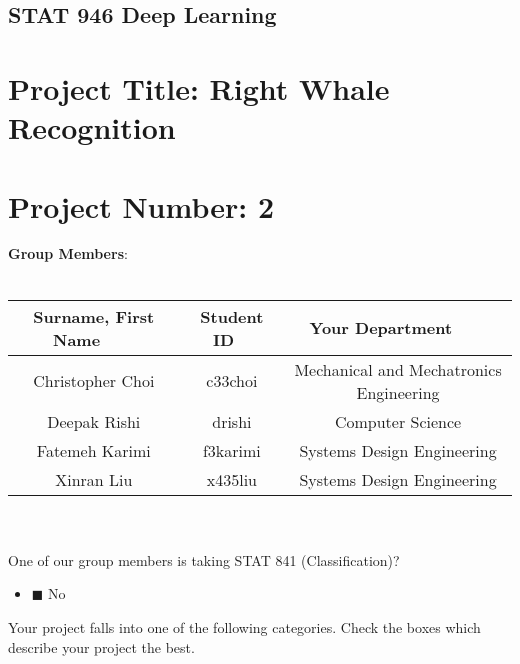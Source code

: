 \documentclass[11pt]{article}
\begin{document}
\begin{center}
\section*{STAT 946 Deep Learning}
\end{center}
\section*{Project Title: Right Whale Recognition}
\section*{Project Number: 2}

{\large \textbf{Group Members}:}\\\\
\begin{tabular}{|c|c||c| }
  \hline
Surname, First Name $~~~~~~~~$& Student ID  $~~~$  &  Your Department $~~~~~~~~$  \\
  \hline \hline
Christopher Choi & c33choi & Mechanical and Mechatronics Engineering  \\\hline
Deepak Rishi & drishi & Computer Science \\\hline
Fatemeh Karimi & f3karimi & Systems Design Engineering \\ \hline
Xinran Liu & x435liu & Systems Design Engineering \\
     \hline
\end{tabular}\\\\

	
One of our group members is taking STAT 841 (Classification)? 
\begin{itemize}
\item $\blacksquare$  No
\end{itemize}
  
Your project falls into one of the following categories. Check the
boxes which describe your project the best.
\end{document}
